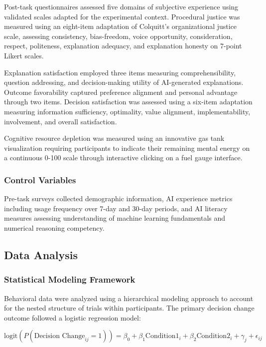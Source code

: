 \documentclass[conference]{IEEEtran}
\begin{document}
Post-task questionnaires assessed five domains of subjective experience using validated scales adapted for the experimental context. Procedural justice was measured using an eight-item adaptation of Colquitt's organizational justice scale, assessing consistency, bias-freedom, voice opportunity, consideration, respect, politeness, explanation adequacy, and explanation honesty on 7-point Likert scales.

Explanation satisfaction employed three items measuring comprehensibility, question addressing, and decision-making utility of AI-generated explanations. Outcome favorability captured preference alignment and personal advantage through two items. Decision satisfaction was assessed using a six-item adaptation measuring information sufficiency, optimality, value alignment, implementability, involvement, and overall satisfaction.

Cognitive resource depletion was measured using an innovative gas tank visualization requiring participants to indicate their remaining mental energy on a continuous 0-100 scale through interactive clicking on a fuel gauge interface.

\subsubsection{Control Variables}

Pre-task surveys collected demographic information, AI experience metrics including usage frequency over 7-day and 30-day periods, and AI literacy measures assessing understanding of machine learning fundamentals and numerical reasoning competency.

\subsection{Data Analysis}

\subsubsection{Statistical Modeling Framework}

Behavioral data were analyzed using a hierarchical modeling approach to account for the nested structure of trials within participants. The primary decision change outcome followed a logistic regression model:

\begin{equation}
\text{logit}(P(\text{Decision Change}_{ij} = 1)) = \beta_0 + \beta_1 \text{Condition1}_i + \beta_2 \text{Condition2}_i + \gamma_j + \epsilon_{ij}
\end{equation}
\end{document}
